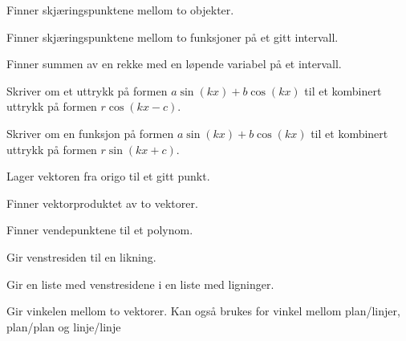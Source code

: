 {Finner skjæringspunktene mellom to objekter. 
}

{Finner skjæringspunktene mellom to funksjoner på et gitt intervall.}

 {
Finner summen av en rekke med en løpende variabel på et intervall.
}

{Skriver om et uttrykk på formen $ a\sin (kx) + b\cos (kx) $ til et kombinert uttrykk på formen $ r\cos (kx-c) $.}

{Skriver om en funksjon på formen $ {a\sin (kx) + b\cos (kx) }$ til et kombinert uttrykk på formen $ r\sin (kx+c) $.}


 {
Lager vektoren fra origo til et gitt punkt. \\
}

{Finner vektorproduktet av to vektorer. \\
}

{Finner vendepunktene til et polynom.}

{Gir venstresiden til en likning.}

{Gir en liste med venstresidene i en liste med ligninger.}

{Gir vinkelen mellom to vektorer. Kan også brukes for vinkel mellom plan/linjer, plan/plan og linje/linje}







\regsin

\retn

\skalar



\summ



\trikomb

\vektor

\vekpro

\vend

